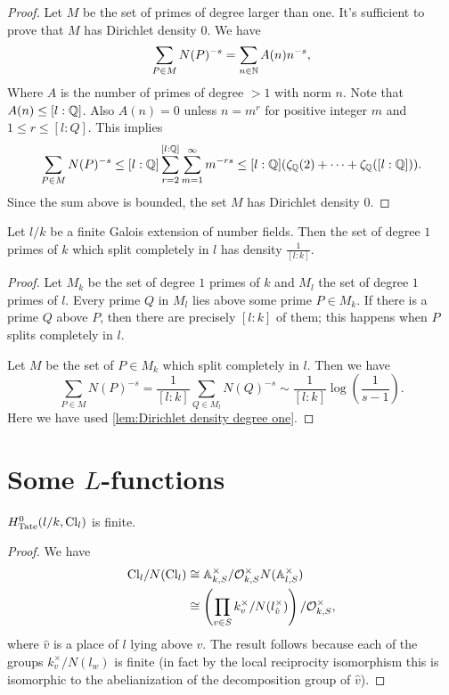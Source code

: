 \begin{proof}
	Let $M$ be the set of primes of degree larger than one. It's sufficient to
	prove that $M$ has Dirichlet density $0$.
	We have
	\[
		\sum_{P \in M} N(P)^{-s}
		= \sum_{n \in {\mathbb N}} A(n) n^{-s},
	\]
	Where $A$ is the number of primes of degree $>1$ with norm $n$.
	Note that $A(n) \le [l:{\mathbb Q}]$. Also $A(n)=0$ unless $n=m^r$ for positive integer $m$ and
	$1 \le r \le [l:Q]$.
	This implies
	\[
		\sum_{P \in M} N(P)^{-s}
		\le [l:{\mathbb Q}] \sum_{r=2}^{[l:{\mathbb Q}]} \sum_{m =1} ^\infty m^{-rs}
		\le [l:{\mathbb Q}] (\zeta_{\mathbb Q}(2) + \cdots + \zeta_{\mathbb Q}([l:{\mathbb Q}]) ).
	\]
	Since the sum above is bounded, the set $M$ has Dirichlet density $0$.
\end{proof}


\begin{lemma} \label{lem:Dirichlet density split}
	Let $l/k$ be a finite Galois extension of number fields.
	Then the set of degree $1$ primes of $k$ which split completely in $l$
	has density $\frac{1}{[l:k]}$.
\end{lemma}

\begin{proof}
	Let $M_k$ be the set of degree $1$ primes of $k$ and $M_l$ the set of degree $1$ primes of $l$.
	Every prime $Q$ in $M_l$ lies above some prime $P \in M_k$.
	If there is a prime $Q$ above $P$, then there are precisely $[l:k]$ of them; this happens when $P$
	splits completely in $l$.

	Let $M$ be the set of $P \in M_k$ which split completely in $l$.
	Then we have
	\[
		\sum_{P \in M} N(P)^{-s}
		=
		\frac{1}{[l:k]} \sum_{Q \in M_l} N(Q)^{-s}
		\sim \frac{1}{[l:k]} \log\left( \frac{1}{s-1}\right).
	\]
	Here we have used \ref{lem:Dirichlet density degree one}.
\end{proof}





\section{Some $L$-functions}

\begin{lemma}
	$H^0_{\mathrm{Tate}}(l/k,\mathrm{Cl}_l)$ is finite.
\end{lemma}

\begin{proof}
	We have
	\begin{align*}
		\mathrm{Cl}_{l} / N(\mathrm{Cl}_l)
		& \cong {\mathbb A}_{k,S}^\times / {\mathcal O}_{k,S}^\times N({\mathbb A}_{l,S}^\times) \\
		& \cong \left(\prod_{v \in S} k_v^\times / N(l_{\hat v}^\times)\right) / {\mathcal O}_{k,S}^\times,
	\end{align*}
	where $\hat v$ is a place of $l$ lying above $v$.
	The result follows because each of the groups $k_v^\times / N(l_w)$ is finite
	(in fact by the local reciprocity isomorphism this is isomorphic to the abelianization of the
	decomposition group of $\hat v$).
\end{proof}


